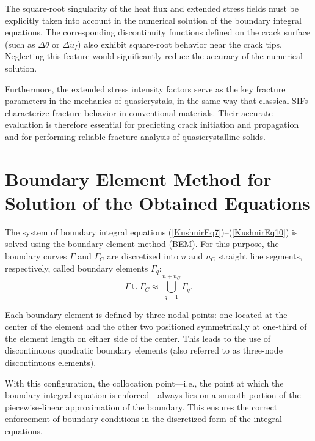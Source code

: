 The square-root singularity of the heat flux and extended stress
fields must be explicitly taken into account in the numerical solution
of the boundary integral equations. The corresponding discontinuity
functions defined on the crack surface (such as $\Delta\theta$ or
$\Delta\tilde{u}_{I}$) also exhibit square-root behavior near the
crack tips. Neglecting this feature would significantly reduce the
accuracy of the numerical solution.

Furthermore, the extended stress intensity factors serve as the key
fracture parameters in the mechanics of quasicrystals, in the same
way that classical SIFs characterize fracture behavior in conventional
materials. Their accurate evaluation is therefore essential for
predicting crack initiation and propagation and for performing
reliable fracture analysis of quasicrystalline solids.

\section{Boundary Element Method for Solution of the Obtained Equations}

The system of boundary integral equations
(\ref{KushnirEq7})--(\ref{KushnirEq10})
is solved using the boundary element method (BEM).
For this purpose, the boundary curves $\Gamma$ and $\Gamma_{C}$ are
discretized into $n$ and $n_{C}$ straight line segments, respectively,
called boundary elements $\Gamma_{q}$:
\[
\Gamma \cup \Gamma_{C}
\approx
\bigcup_{q=1}^{n+n_{C}} \Gamma_{q}.
\]

Each boundary element is defined by three nodal points: one located
at the center of the element and the other two positioned symmetrically
at one-third of the element length on either side of the center.
This leads to the use of discontinuous quadratic boundary elements
(also referred to as three-node discontinuous elements).

With this configuration, the collocation point—i.e., the point at
which the boundary integral equation is enforced—always lies on a
smooth portion of the piecewise-linear approximation of the boundary.
This ensures the correct enforcement of boundary conditions in the
discretized form of the integral equations.

